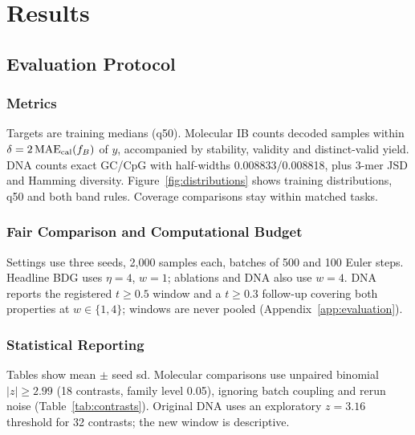 \documentclass{article}
\begin{document}
\section{Results}
\subsection{Evaluation Protocol}\label{sec:protocol}
\subsubsection{Metrics}
Targets are training medians (q50). Molecular IB counts decoded samples within $\delta=2\operatorname{MAE}_{\rm cal}(f_B)$ of $y$, accompanied by stability, validity and distinct-valid yield. DNA counts exact GC/CpG with half-widths 0.008833/0.008818, plus 3-mer JSD and Hamming diversity. Figure~\ref{fig:distributions} shows training distributions, q50 and both band rules. Coverage comparisons stay within matched tasks.
\subsubsection{Fair Comparison and Computational Budget}
Settings use three seeds, 2,000 samples each, batches of 500 and 100 Euler steps. Headline BDG uses $\eta=4$, $w=1$; ablations and DNA also use $w=4$. DNA reports the registered $t\ge0.5$ window and a $t\ge0.3$ follow-up covering both properties at $w\in\{1,4\}$; windows are never pooled (Appendix~\ref{app:evaluation}).
\subsubsection{Statistical Reporting}
Tables show mean $\pm$ seed sd. Molecular comparisons use unpaired binomial $|z|\ge2.99$ (18 contrasts, family level 0.05), ignoring batch coupling and rerun noise (Table~\ref{tab:contrasts}). Original DNA uses an exploratory $z=3.16$ threshold for 32 contrasts; the new window is descriptive.
\end{document}
